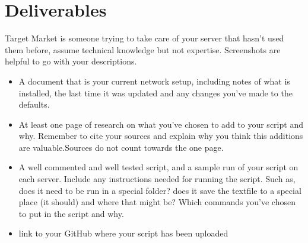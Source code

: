 \documentclass[12pt]{article}
\begin{document}
\section*{Deliverables}
Target Market is someone trying to take care of your server that hasn't used them before, assume technical knowledge but not expertise.  Screenshots are helpful to go with your descriptions. 

\begin{itemize}
    \item A  document that is your current network setup, including notes of what is installed, the last time it was updated and any changes you've made to the defaults. 
    \item At least one page of research on what you've chosen to add to your script and why.  Remember to cite your sources and explain why you think this additions are valuable.Sources do not count towards the one page.
    \item A well commented and well tested script, and a sample run of your script on each server.  Include any instructions needed for running the script.  Such as, does it need to be run in a special folder? does it save the textfile to a special place (it should) and where that might be? Which commands you've chosen to put in the script and why.
    \item link to your GitHub where your script has been uploaded
\end{itemize}
\end{document}

